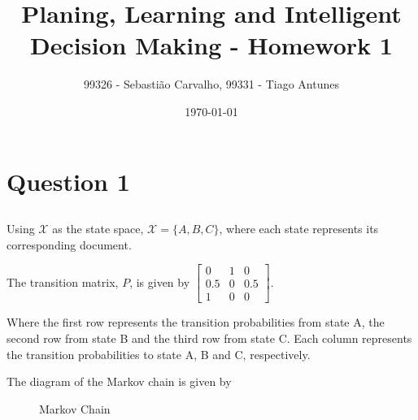 \documentclass{article}
\title{Planing, Learning and Intelligent Decision Making - Homework 1}
\author{99326 - Sebastião Carvalho, 99331 - Tiago Antunes}
\date{\today}
\begin{document}
\maketitle

\tableofcontents

\section{Question 1}

\subsection{}

Using $\mathcal{X}$ as the state space, $\mathcal{X} = \{ A, B, C\}$, where each state represents its corresponding document.

\bigskip

The transition matrix, $P$, is given by
$
\begin{bmatrix}
    0 & 1 & 0 \\
    0.5 & 0 & 0.5 \\
    1 & 0 & 0
\end{bmatrix}
$.

\bigskip

Where the first row represents the transition probabilities from state A, the second row from state B and the third row from state C.
Each column represents the transition probabilities to state A, B and C, respectively.

\bigskip

The diagram of the Markov chain is given by

\begin{figure}
    \centering
    \caption{Markov Chain}
    \label{fig: markov_chain}
\end{figure}


\subsection{}
\end{document}
